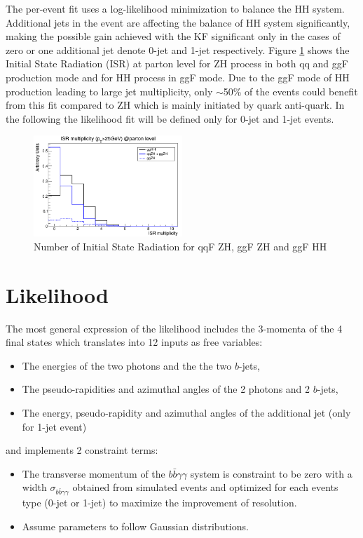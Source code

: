 The per-event fit uses a log-likelihood minimization to balance the HH system. Additional jets in the event are affecting the balance of HH system significantly, making the possible gain achieved with the KF significant only in the cases of zero or one additional jet denote 0-jet and 1-jet respectively. Figure \ref{fig:Adx4:ISR} shows the Initial State Radiation (ISR) at parton level for ZH process in both qq and ggF production mode and for HH process in ggF mode. Due to the ggF mode of HH production leading to large jet multiplicity, only $\sim$50\% of the events could benefit from this fit compared to ZH which is mainly initiated by quark anti-quark. In the following the likelihood fit will be defined only for 0-jet and 1-jet events.  
\begin{figure}[htbp]
    \centering
    \includegraphics[width=0.5\textwidth]{Adx/Adx4/Img/isr.png}
    \caption{Number of Initial State Radiation for qqF ZH, ggF ZH and ggF HH }
    \label{fig:Adx4:ISR}
\end{figure}

\section{Likelihood}

The most general expression of the likelihood includes the 3-momenta of the 4 final states which translates into 12 inputs as free variables:
\begin{itemize}
    \item The energies of the two photons and the the two $b$-jets,
    \item The pseudo-rapidities and azimuthal angles of the 2 photons and 2 $b$-jets,
    \item The energy, pseudo-rapidity and azimuthal angles of the additional jet (only for 1-jet event)
\end{itemize}
and implements 2 constraint terms:
\begin{itemize}
    \item The transverse momentum of the $b\bar{b}\gamma\gamma$ system is constraint to be zero with a width $\sigma_{b\bar{b}\gamma\gamma}$ obtained from simulated \HHyybb events and optimized for each events type (0-jet or 1-jet) to maximize the improvement of \mbb resolution.
    \item Assume parameters to follow Gaussian distributions.
\end{itemize}

